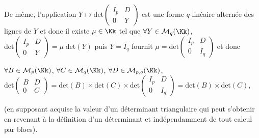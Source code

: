{{De même, l'application $Y\mapsto\text{det}\left(
 \begin{array}{cc}
 I_p&D\\
 0&Y
 \end{array}
 \right)$ est une forme $q$-linéaire alternée des lignes de $Y$ et donc il existe $\mu\in\Kk$ tel que $\forall Y\in\mathcal{M}_q(\Kk)$, $\text{det}\left(
 \begin{array}{cc}
 I_p&D\\
 0&Y
 \end{array}
 \right)=\mu\;\text{det}(Y)$ puis $Y=I_q$ fournit $\mu=\text{det}\left(
 \begin{array}{cc}
 I_p&D\\
 0&I_q
 \end{array}
 \right)$ et donc 
 
 \begin{center}
 $\forall B\in\mathcal{M}_p(\Kk)$, $\forall C\in\mathcal{M}_q(\Kk)$, $\forall D\in\mathcal{M}_{p,q}(\Kk)$, $\text{det}\left(
 \begin{array}{cc}
 B&D\\
 0&C
 \end{array}
 \right)=\text{det}(B)\times\text{det}(C)\times\text{det}\left(
 \begin{array}{cc}
 I_p&D\\
 0&I_q
 \end{array}
 \right)=\text{det}(B)\times\text{det}(C)$,
 \end{center}
 

(en supposant acquise la valeur d'un déterminant triangulaire qui peut s'obtenir en revenant à la définition d'un déterminant et indépendamment de tout calcul par blocs).

 \begin{center}
 \end{center}}
}